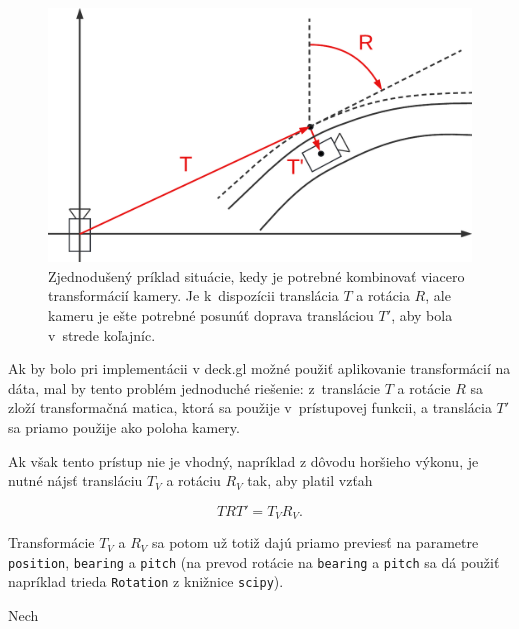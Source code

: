\begin{figure}[h]
    \centering
    \includegraphics[width=0.8\linewidth]{text_prace/obrazky-figures/tri_transformacie.pdf}
    \caption{Zjednodušený príklad situácie, kedy je potrebné kombinovať viacero transformácií kamery. Je k~dispozícii translácia $T$ a rotácia $R$, ale kameru je ešte potrebné posunúť doprava transláciou $T'$, aby bola v~strede koľajníc.}
    \label{fig:transformacie_kamery}
\end{figure}

Ak by bolo pri implementácii v deck.gl možné použiť aplikovanie transformácií na dáta, mal by tento problém jednoduché riešenie: z~translácie $T$ a rotácie $R$ sa zloží transformačná matica, ktorá sa použije v~prístupovej funkcii, a translácia $T'$ sa priamo použije ako poloha kamery.

Ak však tento prístup nie je vhodný, napríklad z dôvodu horšieho výkonu, je nutné nájsť transláciu $T_V$ a rotáciu $R_V$ tak, aby platil vzťah 

$$ T R T' = T_V R_V \mathrm{.}$$

Transformácie $T_V$ a $R_V$ sa potom už totiž dajú priamo previesť na parametre \texttt{position}, \texttt{bearing} a \texttt{pitch} (na prevod rotácie na \texttt{bearing} a \texttt{pitch} sa dá použiť napríklad trieda \texttt{Rotation} z knižnice \texttt{scipy}).

Nech

